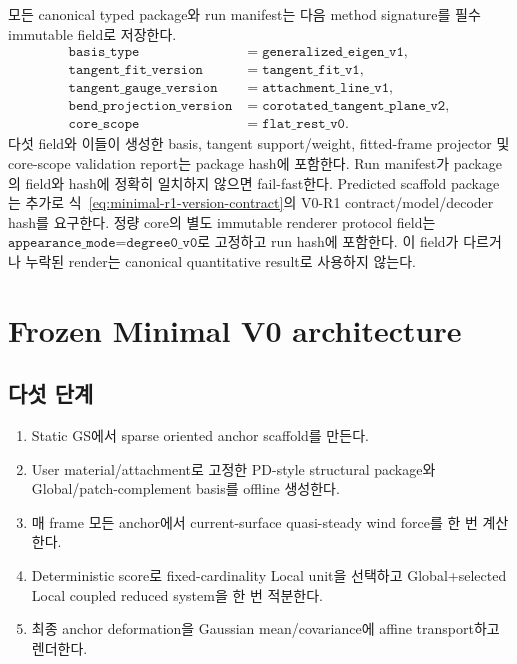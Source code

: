 \documentclass[11pt]{article}
\begin{document}
모든 canonical typed package와 run manifest는 다음 method signature를 필수 immutable field로 저장한다.
\[
\begin{aligned}
  \texttt{basis\_type} &= \texttt{generalized\_eigen\_v1},\\
  \texttt{tangent\_fit\_version} &= \texttt{tangent\_fit\_v1},\\
  \texttt{tangent\_gauge\_version} &= \texttt{attachment\_line\_v1},\\
  \texttt{bend\_projection\_version} &= \texttt{corotated\_tangent\_plane\_v2},\\
  \texttt{core\_scope} &= \texttt{flat\_rest\_v0}.
\end{aligned}
\]
다섯 field와 이들이 생성한 basis, tangent support/weight, fitted-frame projector 및
core-scope validation report는 package hash에 포함한다. Run manifest가 package의 field와 hash에
정확히 일치하지 않으면 fail-fast한다. Predicted scaffold package는 추가로
식~\eqref{eq:minimal-r1-version-contract}의 V0-R1 contract/model/decoder hash를 요구한다.
정량 core의 별도 immutable renderer protocol field는
\(\texttt{appearance\_mode=degree0\_v0}\)로 고정하고 run hash에 포함한다.
이 field가 다르거나 누락된 render는 canonical quantitative result로 사용하지 않는다.

\section{Frozen Minimal V0 architecture}

\subsection{다섯 단계}

\begin{enumerate}
  \item Static GS에서 sparse oriented anchor scaffold를 만든다.
  \item User material/attachment로 고정한 PD-style structural package와
  Global/patch-complement basis를 offline 생성한다.
  \item 매 frame 모든 anchor에서 current-surface quasi-steady wind force를 한 번 계산한다.
  \item Deterministic score로 fixed-cardinality Local unit을 선택하고
  Global+selected Local coupled reduced system을 한 번 적분한다.
  \item 최종 anchor deformation을 Gaussian mean/covariance에 affine transport하고 렌더한다.
\end{enumerate}
\end{document}
